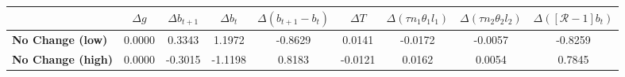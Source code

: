 \begin{tiny}\begin{tabular}{|l|c|c|c|c|c|c|c|c|}
\hline
&\textbf{$\Delta g$}&\textbf{$\Delta b_{t+1}$}&\textbf{$\Delta b_{t}$}&\textbf{$\Delta (b_{t+1}-b_t)$}&\textbf{$\Delta T$}&\textbf{$\Delta (\tau n_1\theta_1 l_1 )$}&\textbf{$\Delta (\tau n_2\theta_2 l_2)$}&\textbf{$\Delta ([\mathcal{R}-1]b_t)$}\\\hline
\textbf{No Change (low)}&0.0000&0.3343&1.1972&-0.8629&0.0141&-0.0172&-0.0057&-0.8259\\\hline
\textbf{No Change (high)}&0.0000&-0.3015&-1.1198&0.8183&-0.0121&0.0162&0.0054&0.7845\\\hline
\end{tabular}
\end{tiny}